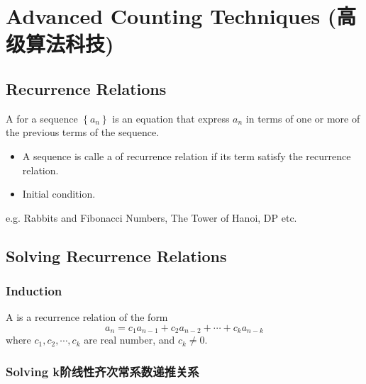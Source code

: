 \section[Advanced Counting Techniques]{Advanced Counting Techniques (高级算法科技)}
\subsection{Recurrence Relations}

\begin{definition}
    A  for a sequence $\left\{a_n \right\}$ is an equation that express $a_n$ in terms of one or more of the previous terms of the sequence. 
    \begin{itemize}
        \item A sequence is calle a  of recurrence relation if its term satisfy the recurrence relation. 
        \item Initial condition. 
    \end{itemize}
\end{definition}

e.g. Rabbits and Fibonacci Numbers, The Tower of Hanoi, DP etc. 

\subsection{Solving Recurrence Relations}

\subsubsection{Induction}
\begin{definition}
    A  is a recurrence relation of the form
    \[ a_n = c_1a_{n-1} + c_2a_{n-2}+ \cdots + c_k a_{n-k} \]
    where $c_1,c_2,\cdots,c_k$ are real number, and $c_k \ne 0$.
\end{definition}

\subsubsection{Solving k阶线性齐次常系数递推关系}

